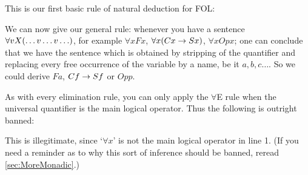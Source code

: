 This is our first basic rule of natural deduction for FOL: 
\begin{highlighted}
	\begin{fitchproof}
		 
	\end{fitchproof}
\end{highlighted}




We can now give our general rule: whenever you have a sentence $\forall vX(\ldots v \ldots v\ldots)$, for example $\forall x Fx$, $\forall x (Cx\rightarrow Sx)$, $\forall x Opx$; one can conclude that we have the sentence which is obtained by stripping of the quantifier and replacing every free occurrence of the variable by a name, be it $a,b,c\ldots$. So we could derive $Fa$, $Cf\rightarrow Sf$ or $Opp$.



As with every elimination rule, you can only apply the $\forall$E rule when the universal quantifier is the main logical operator. Thus the following is outright banned:
\begin{fitchproof}
\end{fitchproof}
This is illegitimate, since `$\forall x$' is not the main logical operator in line 1. (If you need a reminder as to why this sort of inference should be banned, reread \cref{sec:MoreMonadic}.)




